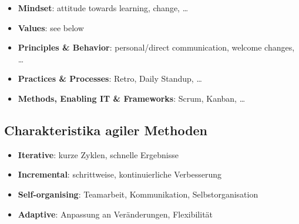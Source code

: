 \documentclass{article}
\begin{document}
\begin{itemize}
  \item \textbf{Mindset}: attitude towards learning, change, …
  \item \textbf{Values}: see below
  \item \textbf{Principles \& Behavior}: personal/direct communication, welcome changes, …
  \item \textbf{Practices \& Processes}: Retro, Daily Standup, …
  \item \textbf{Methods, Enabling IT \& Frameworks}: Scrum, Kanban, …
\end{itemize}

\subsection{Charakteristika agiler Methoden}
\begin{itemize}
  \item \textbf{Iterative}: kurze Zyklen, schnelle Ergebnisse
  \item \textbf{Incremental}: schrittweise, kontinuierliche Verbesserung
  \item \textbf{Self-organising}: Teamarbeit, Kommunikation, Selbstorganisation
  \item \textbf{Adaptive}: Anpassung an Veränderungen, Flexibilität
\end{itemize}
\end{document}
